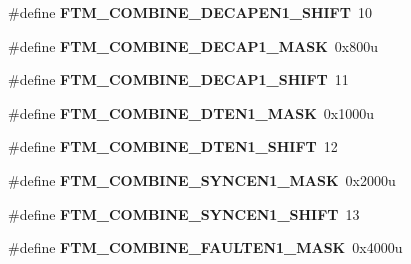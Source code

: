 \begin{DoxyCompactItemize}
\item 
\#define {\bfseries F\+T\+M\+\_\+\+C\+O\+M\+B\+I\+N\+E\+\_\+\+D\+E\+C\+A\+P\+E\+N1\+\_\+\+S\+H\+I\+FT}~10\hypertarget{group__FTM__Register__Masks_ga6fa24cab05a8839e131ce86612a77330}{}\label{group__FTM__Register__Masks_ga6fa24cab05a8839e131ce86612a77330}

\item 
\#define {\bfseries F\+T\+M\+\_\+\+C\+O\+M\+B\+I\+N\+E\+\_\+\+D\+E\+C\+A\+P1\+\_\+\+M\+A\+SK}~0x800u\hypertarget{group__FTM__Register__Masks_ga8fdebd40c2860511d58ce7e15cf7a875}{}\label{group__FTM__Register__Masks_ga8fdebd40c2860511d58ce7e15cf7a875}

\item 
\#define {\bfseries F\+T\+M\+\_\+\+C\+O\+M\+B\+I\+N\+E\+\_\+\+D\+E\+C\+A\+P1\+\_\+\+S\+H\+I\+FT}~11\hypertarget{group__FTM__Register__Masks_ga888ebd3f18cacc007fa0cd2073cdca1d}{}\label{group__FTM__Register__Masks_ga888ebd3f18cacc007fa0cd2073cdca1d}

\item 
\#define {\bfseries F\+T\+M\+\_\+\+C\+O\+M\+B\+I\+N\+E\+\_\+\+D\+T\+E\+N1\+\_\+\+M\+A\+SK}~0x1000u\hypertarget{group__FTM__Register__Masks_ga9d461bde34f5c5fad944a58e61c3fb44}{}\label{group__FTM__Register__Masks_ga9d461bde34f5c5fad944a58e61c3fb44}

\item 
\#define {\bfseries F\+T\+M\+\_\+\+C\+O\+M\+B\+I\+N\+E\+\_\+\+D\+T\+E\+N1\+\_\+\+S\+H\+I\+FT}~12\hypertarget{group__FTM__Register__Masks_ga6a1bc35db122f0f887a50b1ac9157657}{}\label{group__FTM__Register__Masks_ga6a1bc35db122f0f887a50b1ac9157657}

\item 
\#define {\bfseries F\+T\+M\+\_\+\+C\+O\+M\+B\+I\+N\+E\+\_\+\+S\+Y\+N\+C\+E\+N1\+\_\+\+M\+A\+SK}~0x2000u\hypertarget{group__FTM__Register__Masks_gad635d904007b2c80c096efe6f5a8c7c2}{}\label{group__FTM__Register__Masks_gad635d904007b2c80c096efe6f5a8c7c2}

\item 
\#define {\bfseries F\+T\+M\+\_\+\+C\+O\+M\+B\+I\+N\+E\+\_\+\+S\+Y\+N\+C\+E\+N1\+\_\+\+S\+H\+I\+FT}~13\hypertarget{group__FTM__Register__Masks_ga5190e8c0896bf03060b19eb8b4a0c524}{}\label{group__FTM__Register__Masks_ga5190e8c0896bf03060b19eb8b4a0c524}

\item 
\#define {\bfseries F\+T\+M\+\_\+\+C\+O\+M\+B\+I\+N\+E\+\_\+\+F\+A\+U\+L\+T\+E\+N1\+\_\+\+M\+A\+SK}~0x4000u\hypertarget{group__FTM__Register__Masks_ga80468385e5f9888483457adac7de12f1}{}\label{group__FTM__Register__Masks_ga80468385e5f9888483457adac7de12f1}


\end{DoxyCompactItemize}
